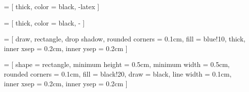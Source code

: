  =
[
    thick,
    color   = black,
    -latex
]




 =
[
    thick,
    color   = black,
    -
]




 =
[
    draw,
    rectangle,
    drop shadow,
    rounded corners = 0.1cm,
    fill            = blue!10,
    thick,
    inner xsep      = 0.2cm,        %
    inner ysep      = 0.2cm         %
]



\tikzfading %
[
    name            = middle,
    top color       = transparent!100,
    bottom color    = transparent!100,
    middle color    = transparent!00,
]



 =
[
    shape           = rectangle,
    minimum height  = 0.5cm,
    minimum width   = 0.5cm,
    rounded corners = 0.1cm,
    fill            = black!20,
    draw            = black,
    line width      = 0.1cm,
    inner xsep      = 0.2cm,
    inner ysep      = 0.2cm
]
